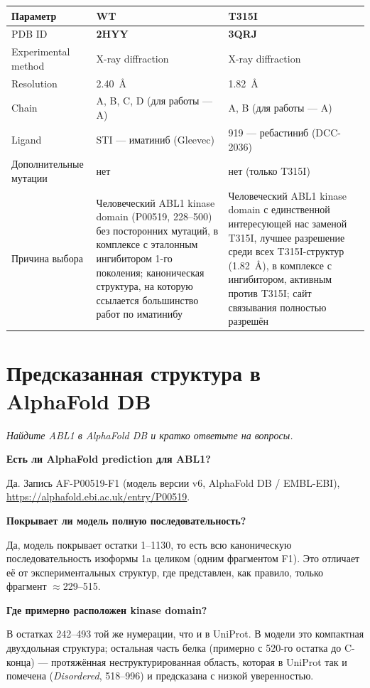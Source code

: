 \documentclass[11pt,a4paper]{article}
\newcommand{\code}[1]{{\ttfamily #1}}
\newcommand{\instr}[1]{{\small\itshape #1\par}}
\begin{document}
\begin{center}
\begin{tabular}{|L{3.2cm}|L{6cm}|L{6cm}|}
\hline
\textbf{Параметр} & \textbf{WT} & \textbf{T315I} \\
\hline
PDB ID & \textbf{2HYY} & \textbf{3QRJ} \\
\hline
Experimental method & X-ray diffraction & X-ray diffraction \\
\hline
Resolution & 2.40~\AA & 1.82~\AA \\
\hline
Chain & A, B, C, D (для работы --- A) & A, B (для работы --- A) \\
\hline
Ligand & STI --- иматиниб (Gleevec) & 919 --- ребастиниб (DCC-2036) \\
\hline
Дополнительные мутации & нет & нет (только T315I) \\
\hline
Причина выбора & Человеческий ABL1 kinase domain (P00519, 228--500) без посторонних
мутаций, в комплексе с эталонным ингибитором 1-го поколения; каноническая структура, на
которую ссылается большинство работ по иматинибу & Человеческий ABL1 kinase domain с
единственной интересующей нас заменой T315I, лучшее разрешение среди всех
T315I-структур (1.82~\AA), в комплексе с ингибитором, активным против T315I; сайт
связывания полностью разрешён \\
\hline
\end{tabular}
\end{center}

\section{Предсказанная структура в AlphaFold DB}
\instr{Найдите ABL1 в AlphaFold DB и кратко ответьте на вопросы.}

\textbf{Есть ли AlphaFold prediction для ABL1?}

Да. Запись \code{AF-P00519-F1} (модель версии v6, AlphaFold DB / EMBL-EBI),
\url{https://alphafold.ebi.ac.uk/entry/P00519}.

\textbf{Покрывает ли модель полную последовательность?}

Да, модель покрывает остатки 1--1130, то есть всю каноническую последовательность
изоформы 1a целиком (одним фрагментом F1). Это отличает её от экспериментальных
структур, где представлен, как правило, только фрагмент $\approx$229--515.

\textbf{Где примерно расположен kinase domain?}

В остатках 242--493 той же нумерации, что и в UniProt. В модели это компактная
двухдольная структура; остальная часть белка (примерно с 520-го остатка до C-конца) ---
протяжённая неструктурированная область, которая в UniProt так и помечена
(\emph{Disordered}, 518--996) и предсказана с низкой уверенностью.
\end{document}
